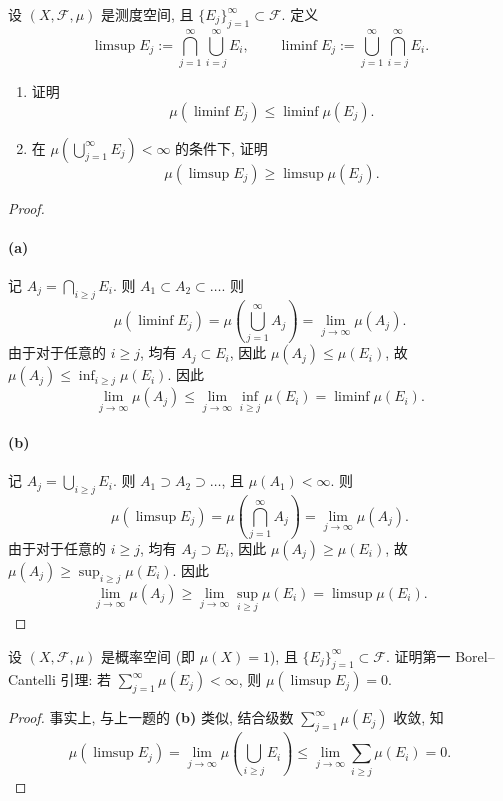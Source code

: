 \documentclass{article}
\begin{document}
\begin{problem}
  设 $(X,\mathcal{F},\mu)$ 是测度空间, 且 $\{E_j\}_{j=1}^\infty\subset\mathcal{F}$. 定义
  \[
    \limsup E_j:=\bigcap_{j=1}^\infty\bigcup_{i=j}^\infty E_i,
    \qquad
    \liminf E_j:=\bigcup_{j=1}^\infty\bigcap_{i=j}^\infty E_i.
  \]
  \begin{enumerate}
    \item[(a)] 证明
      \[
        \mu(\liminf E_j)\leq\liminf\mu(E_j).
      \]
    \item[(b)] 在 $\mu(\bigcup_{j=1}^\infty E_j)<\infty$ 的条件下, 证明
      \[
        \mu(\limsup E_j)\geq\limsup\mu(E_j).
      \]
  \end{enumerate}
\end{problem}

\begin{proof}
	\paragraph{(a)} 记 $A_j = \bigcap_{i \ge j}^{}E_i$. 则 $A_1 \subset A_2 \subset \dots$. 则
	\[ \mu(\liminf E_j) = \mu \left( \bigcup_{j = 1}^{\infty} A_j \right) = \lim_{j \to \infty} \mu(A_j). \]
	由于对于任意的 $i \ge j$, 均有 $A_j \subset E_i$, 因此 $\mu(A_j) \le \mu(E_i)$, 故 $\mu(A_j) \le \inf_{i \ge j}\mu(E_i)$. 因此
	\[ \lim_{j \to \infty} \mu(A_j) \le \lim_{j \to \infty} \inf_{i \ge j} \mu(E_i) = \liminf \mu(E_i). \]

	\paragraph{(b)} 记 $A_j = \bigcup_{i \ge j}^{}E_i$. 则 $A_1 \supset A_2 \supset \dots$, 且 $\mu(A_1) < \infty$. 则
	\[ \mu(\limsup E_j) = \mu \left( \bigcap_{j = 1}^{\infty} A_j \right) = \lim_{j \to \infty} \mu(A_j). \]
	由于对于任意的 $i \ge j$, 均有 $A_j \supset E_i$, 因此 $\mu(A_j) \ge \mu(E_i)$, 故 $\mu(A_j) \ge \sup_{i \ge j}\mu(E_i)$. 因此
	\[ \lim_{j \to \infty} \mu(A_j) \ge \lim_{j \to \infty} \sup_{i \ge j} \mu(E_i) = \limsup \mu(E_i). \]
\end{proof}



\begin{problem}
  设 $(X,\mathcal{F},\mu)$ 是概率空间 (即 $\mu(X)=1$), 且 $\{E_j\}_{j=1}^\infty\subset\mathcal{F}$. 证明第一 Borel--Cantelli 引理: 若 $\sum_{j=1}^\infty\mu(E_j)<\infty$, 则 $\mu(\limsup E_j)=0$.
\end{problem}

\begin{proof}
	事实上, 与上一题的 \textbf{(b)} 类似, 结合级数 $\sum_{j = 1}^{\infty}\mu (E_j)$ 收敛, 知
	\[ \mu(\limsup E_j) = \lim_{j \to \infty} \mu\left( \bigcup_{i \ge j}^{}E_i \right) \le \lim_{j \to \infty} \sum_{i \ge j}^{}\mu (E_i) = 0. \]
\end{proof}
\end{document}
